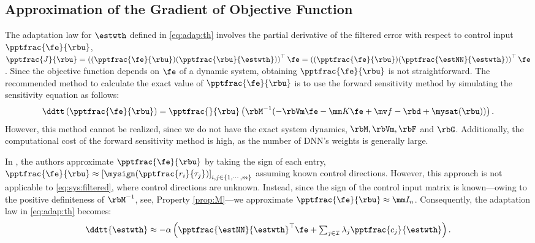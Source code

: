\documentclass[journal]{IEEEtran}
\begin{document}
\subsection{Approximation of the Gradient of Objective Function}

The adaptation law for $\estwth$ defined in \eqref{eq:adap:th} involves the partial derivative of the filtered error with respect to control input $\pptfrac{\fe}{\rbu}$, \ie 
$
    \pptfrac{J}{\rbu}
    =
    \left(
        (\pptfrac{\fe}{\rbu})
        (\pptfrac{\rbu}{\estwth})
    \right)
    ^\top \fe
    =
    \left(
        (\pptfrac{\fe}{\rbu})
        (\pptfrac{\estNN}{\estwth})
    \right)
    ^\top \fe
$. 
Since the objective function depends on $\fe$ of a dynamic system, obtaining $\pptfrac{\fe}{\rbu}$ is not straightforward. 
The recommended method to calculate the exact value of $\pptfrac{\fe}{\rbu}$ is to use the forward sensitivity method \cite{Sengupta:2014aa} by simulating the sensitivity equation as follows: 
\begin{equation}
    \ddtt 
    \left(
        \pptfrac{\fe}{\rbu}
    \right)
    =
    \pptfrac{}{
        \rbu
    }
    \left(
        \rbM^{-1}(
            -\rbVm \fe
            -\mm K \fe
            + \mv f
            -\rbd + \mysat(\rbu)
        )
    \right)
    .
\end{equation}
However, this method cannot be realized, since we do not have the exact system dynamics, \ie $\rbM,\rbVm, \rbF$ and $ \rbG$.
Additionally, the computational cost of the forward sensitivity method is high, as the number of DNN's weights is generally large.

In \cite{Douratsos:2007aa,Saerens:1991aa}, the authors approximate $\pptfrac{\fe}{\rbu}$ by taking the sign of each entry, \ie
$
    \pptfrac{\fe}{\rbu}
    \approx
    \left[
        \mysign(\pptfrac{r_i}{\tau_j})
    \right]_{i,j\in\{1,\cdots,m\}}
$ 
assuming known control directions.
However, this approach is not applicable to \eqref{eq:sys:filtered}, where control directions are unknown.
Instead, since the sign of the control input matrix is known—owing to the positive definiteness of $\rbM^{-1}$, see, Property \ref{prop:M}—we approximate $\pptfrac{\fe}{\rbu}\approx \mm I_n$.
Consequently, the adaptation law in \eqref{eq:adap:th} becomes:
\begin{equation}
    \ddtt{\estwth}
    \approx
    -\alpha 
    \left(
        \pptfrac{\estNN}
        {\estwth}^\top
        \fe
        +
        \textstyle\sum_{j\in\mathcal{I}}
        \lambda_j 
        \pptfrac{c_j}{\estwth}
    \right)
    .
    \label{eq:adap:th:approx}
\end{equation}
\end{document}
